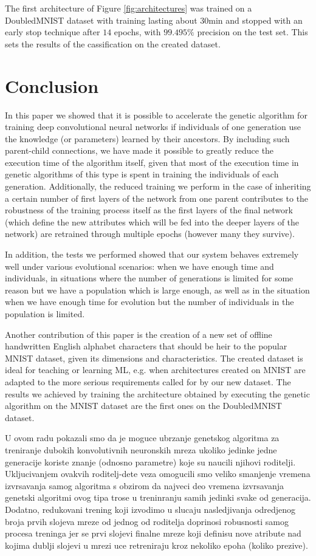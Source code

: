 \documentclass[eng]{simposium}
\begin{document}
The first architecture of Figure \ref{fig:architectures} was trained on a DoubledMNIST dataset with training lasting about 
$30$min and stopped with an early stop technique after $14$ epochs, with $99.495\%$ precision on the test set. 
This sets the results of the cassification on the created dataset. 

\section{Conclusion}


In this paper we showed that it is possible to accelerate the genetic algorithm for training deep convolutional neural networks
if individuals of one generation use the knowledge (or parameters) learned by their ancestors.
By including such parent-child connections, we have made it possible to greatly reduce the execution time of the algorithm itself, given that
most of the execution time in genetic algorithms of this type is spent in training the individuals of each generation.
Additionally, the reduced training we perform in the case of inheriting a certain number of first layers of the network from one parent
contributes to the robustness of the training process itself as the first layers of the final network (which define the new attributes
which will be fed into the deeper layers of the network) are retrained through multiple epochs (however many they survive).

In addition, the tests we performed showed that our system behaves extremely well under various evolutional scenarios:
when we have enough time and individuals, in situations where the number of generations is limited for some reason but we have
a population which is large enough,
as well as in the situation when we have enough time for evolution but the number of individuals in the population is limited.

Another contribution of this paper is the creation of a new set of offline handwritten English alphabet characters that should be
heir to the popular MNIST dataset, given its dimensions and characteristics. The created dataset is ideal
for teaching or learning ML, e.g. when architectures created on MNIST are adapted to the more serious requirements called for 
by our new dataset.
The results we achieved by training the architecture obtained by executing the genetic algorithm on the MNIST dataset are
the first ones on the DoubledMNIST dataset.

U ovom radu pokazali smo da je moguce ubrzanje genetskog algoritma za treniranje dubokih konvolutivnih neuronskih mreza 
ukoliko jedinke jedne generacije koriste znanje (odnosno parametre) koje su naucili njihovi roditelji. 
Ukljucivanjem ovakvih roditelj-dete veza omogucili smo veliko smanjenje vremena izvrsavanja samog algoritma s obzirom da 
najveci deo vremena izvrsavanja genetski algoritmi ovog tipa trose u treninranju samih jedinki svake od generacija. 
Dodatno, redukovani trening koji izvodimo u slucaju nasledjivanja odredjenog broja prvih slojeva mreze od jednog od roditelja 
doprinosi robusnosti samog procesa treninga jer se prvi slojevi finalne mreze koji definisu nove atribute nad kojima dublji 
slojevi u mrezi uce retreniraju kroz nekoliko epoha (koliko prezive). %
\end{document}
